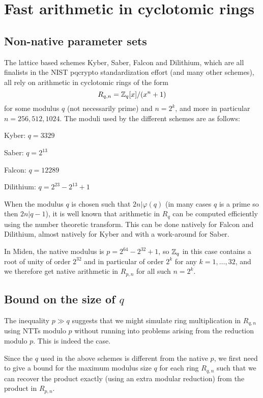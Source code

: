 \section{Fast arithmetic in cyclotomic rings}

\subsection{Non-native parameter sets}

The lattice based schemes Kyber, Saber, Falcon and Dilithium, which are all finalists in the NIST pqcrypto standardization
effort (and many other schemes), all rely on arithmetic in cyclotomic rings of the form
\[  R_{q,n} = \mathbb{Z}_q[x]/(x^n + 1)    \]
for some modulus $q$ (not necessarily prime) and $n = 2^k$, and more in particular $n = 256, 512, 1024$.
The moduli used by the different schemes are as follows:
\bit
\item Kyber: $q = 3329$
\item Saber: $q = 2^{13}$
\item Falcon: $q = 12289$
\item Dilithium: $q = 2^{23} - 2^{13} + 1$
\eit

When the modulus $q$ is chosen such that $2n | \varphi(q)$ (in many cases $q$ is a prime so then $2n | q-1$), 
it is well known that arithmetic in $R_q$ can be computed efficiently using the number theoretic transform.
This can be done natively for Falcon and Dilithium, almost natively for Kyber and with a work-around for Saber.

In Miden, the native modulus is $p = 2^{64} - 2^{32} + 1$, so $\mathbb{Z}_q$ in this case contains a root of unity 
of order $2^{32}$ and in particular of order $2^k$ for any $k = 1, \ldots, 32$, and we therefore get native
arithmetic in $R_{p,n}$ for all such $n = 2^k$.

\subsection{Bound on the size of $q$}

The inequality $p \gg q$ suggests that we might simulate ring multiplication in $R_{q,n}$ using NTTs modulo $p$ without running into problems arising from the reduction modulo $p$. This is indeed the case.

Since the $q$ used in the above schemes is different from the native $p$, we first need to give a bound for
the maximum modulus size $q$ for each ring $R_{q,n}$ such that we can recover the product exactly (using 
an extra modular reduction) from the product in $R_{p,n}$.

